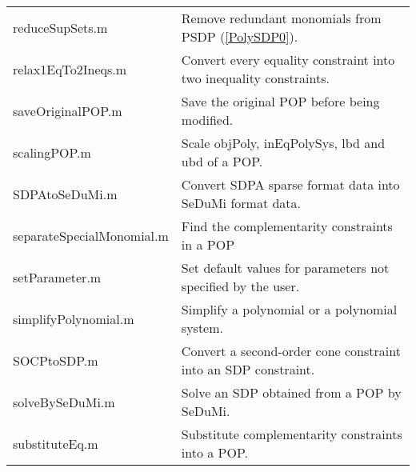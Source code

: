 \hspace*{-2.0cm}
\begin{table}
\begin{tabular}{|l|p{10cm}|} 
\hline
reduceSupSets.m & Remove redundant monomials from PSDP (\ref{PolySDP0}).\\
relax1EqTo2Ineqs.m & Convert every equality constraint into two inequality constraints.\\
saveOriginalPOP.m & Save the original POP before being modified.\\
scalingPOP.m & Scale {\sf objPoly}, {\sf inEqPolySys}, {\sf lbd} and {\sf ubd} of a POP. \\ 
SDPAtoSeDuMi.m &  Convert SDPA sparse format data into SeDuMi format data. \\ 
separateSpecialMonomial.m & Find the complementarity constraints in a POP\\
setParameter.m & Set default values for parameters not specified by the user.\\
simplifyPolynomial.m  & Simplify a polynomial or a polynomial system. \\ 
SOCPtoSDP.m & Convert a second-order cone constraint into an SDP constraint.\\
solveBySeDuMi.m & Solve an SDP obtained from a POP by SeDuMi.\\
substituteEq.m & Substitute complementarity constraints into a POP.\\

\end{tabular}
\end{table}
